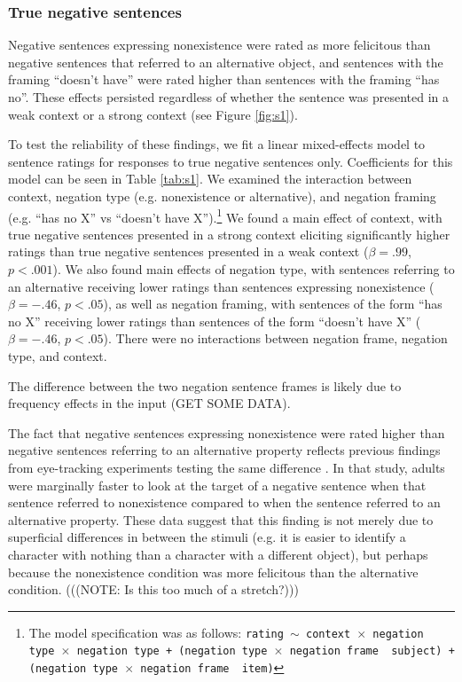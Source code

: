 \documentclass[10pt,letterpaper]{article}
\begin{document}
\subsubsection{True negative sentences}

Negative sentences expressing nonexistence were rated as more felicitous than negative sentences that referred to an alternative object, and sentences with the framing ``doesn't have'' were rated higher than sentences with the framing ``has no''.  These effects persisted regardless of whether the sentence was presented in a weak context or a strong context (see Figure \ref{fig:s1}).  

To test the reliability of these findings, we fit a linear mixed-effects model to sentence ratings for responses to true negative sentences only.  Coefficients for this model can be seen in Table \ref{tab:s1}.  We examined the interaction between context, negation type (e.g. nonexistence or alternative), and negation framing (e.g. ``has no X'' vs ``doesn't have X'').\footnote{ The model specification was as follows: \texttt{rating $\sim$ context~$\times$~negation type~$\times$~negation type + (negation type~$\times$~negation frame~\textbar~subject) +  (negation type~$\times$~negation frame~\textbar~item)}} We found a main effect of context, with true negative sentences presented in a strong context eliciting significantly higher ratings than true negative sentences presented in a weak context ($\beta= .99$, $p< .001$).  We also found main effects of negation type, with sentences referring to an alternative receiving lower ratings than sentences expressing nonexistence ($\beta= -.46$, $p< .05$), as well as negation framing, with sentences of the form ``has no X'' receiving lower ratings than sentences of the form ``doesn't have X''  ($\beta= -.46$, $p< .05$).  There were no interactions between negation frame, negation type, and context.  

The difference between the two negation sentence frames is likely due to frequency effects in the input (GET SOME DATA). 

The fact that negative sentences expressing nonexistence were rated higher than negative sentences referring to an alternative property reflects previous findings from eye-tracking experiments testing the same difference \cite{nordmeyer2014b}.  In that study, adults were marginally faster to look at the target of a negative sentence when that sentence referred to nonexistence compared to when the sentence referred to an alternative property.  These data suggest that this finding is not merely due to superficial differences in between the stimuli (e.g. it is easier to identify a character with nothing than a character with a different object), but perhaps because the nonexistence condition was more felicitous than the alternative condition.  (((NOTE: Is this too much of a stretch?))) 
\end{document}
